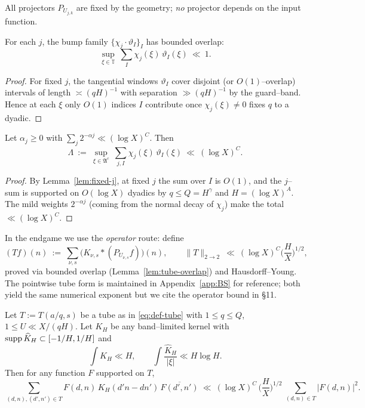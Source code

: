 All projectors $P_{U_{j,k}}$ are fixed by the geometry; \emph{no} projector depends on the input function.

\begin{lemma}\label{lem:fixed-j}
For each $j$, the bump family $\{\chi_j\cdot \vartheta_I\}_I$ has bounded overlap:
\[
\sup_{\xi\in\mathbb T}\ \sum_{I} \chi_j(\xi)\,\vartheta_I(\xi)\ \ll\ 1.
\]
\end{lemma}

\begin{proof}
For fixed $j$, the tangential windows $\vartheta_I$ cover disjoint (or $O(1)$–overlap) intervals of length $\asymp (qH)^{-1}$ with separation $\gg (qH)^{-1}$ by the guard–band. Hence at each $\xi$ only $O(1)$ indices $I$ contribute once $\chi_j(\xi)\ne 0$ fixes $q$ to a dyadic.
\end{proof}

\begin{lemma}\label{lem:sum-j}
Let $\alpha_j\ge 0$ with $\sum_j 2^{-\alpha j}\ll (\log X)^C$. Then
\[
\Lambda\ :=\ \sup_{\xi\in\mathfrak A^c}\ \sum_{j,I} \chi_j(\xi)\,\vartheta_I(\xi)\ \ll\ (\log X)^C.
\]
\end{lemma}

\begin{proof}
By Lemma~\ref{lem:fixed-j}, at fixed $j$ the sum over $I$ is $O(1)$, and the $j$–sum is supported on $O(\log X)$ dyadics by $q\le Q=H^\gamma$ and $H=(\log X)^A$. The mild weights $2^{-\alpha j}$ (coming from the normal decay of $\chi_j$) make the total $\ll(\log X)^C$.
\end{proof}

\begin{remark}\label{rem:route}
In the endgame we use the \emph{operator} route: define
\[
(Tf)(n)\ :=\ \sum_{\nu,s} \big(K_{\nu,s}\ast (P_{U_{\nu,s}} f)\big)(n),
\qquad \|T\|_{2\to 2}\ \ll\ (\log X)^C\Big(\frac{H}{X}\Big)^{1/2},
\]
proved via bounded overlap (Lemma~\ref{lem:tube-overlap}) and Hausdorff--Young. The pointwise tube form is maintained in Appendix~\ref{app:BS} for reference; both yield the same numerical exponent but we cite the operator bound in §11.
\end{remark}

\begin{theorem}\label{thm:SSU-single}
Let $T:=T(a/q,s)$ be a tube as in \eqref{eq:def-tube} with $1\le q\le Q$, $1\le U\ll X/(qH)$.
Let $K_H$ be any band–limited kernel with $\operatorname{supp}\widehat K_H\subset[-1/H,1/H]$ and
\[
\int \widehat K_H\ll H,\qquad \int \frac{\widehat K_H}{|\xi|}\ll H\log H.
\]
Then for any function $F$ supported on $T$,
\begin{equation}\label{eq:SSU-single}
\sum_{(d,n),(d',n')\in T} F(d,n)\,K_H(d'n-dn')\,\overline{F(d',n')}
\ \ll\ (\log X)^C\,\Big(\frac{H}{X}\Big)^{1/2}\ \sum_{(d,n)\in T}|F(d,n)|^2.
\end{equation}
\end{theorem}

